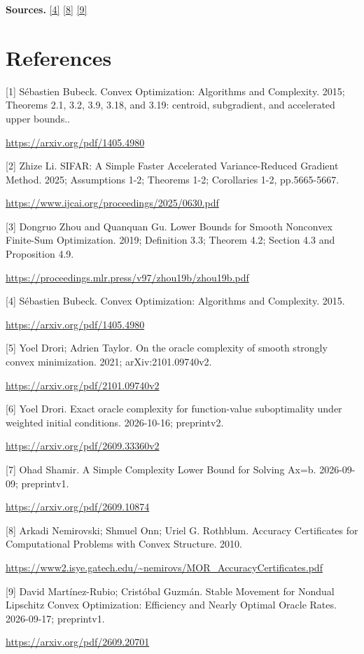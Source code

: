 \documentclass[10pt,a4paper]{article}
\begin{document}
\textbf{Sources.} \href{https://arxiv.org/pdf/1405.4980}{[4]} \href{https://www2.isye.gatech.edu/~nemirovs/MOR_AccuracyCertificates.pdf}{[8]} \href{https://arxiv.org/pdf/2609.20701}{[9]}

\section{References}
[1] Sébastien Bubeck. Convex Optimization: Algorithms and Complexity. 2015; Theorems 2.1, 3.2, 3.9, 3.18, and 3.19: centroid, subgradient, and accelerated upper bounds..

\url{https://arxiv.org/pdf/1405.4980}

[2] Zhize Li. SIFAR: A Simple Faster Accelerated Variance-Reduced Gradient Method. 2025; Assumptions 1-2; Theorems 1-2; Corollaries 1-2, pp.5665-5667.

\url{https://www.ijcai.org/proceedings/2025/0630.pdf}

[3] Dongruo Zhou and Quanquan Gu. Lower Bounds for Smooth Nonconvex Finite-Sum Optimization. 2019; Definition 3.3; Theorem 4.2; Section 4.3 and Proposition 4.9.

\url{https://proceedings.mlr.press/v97/zhou19b/zhou19b.pdf}

[4] Sébastien Bubeck. Convex Optimization: Algorithms and Complexity. 2015.

\url{https://arxiv.org/pdf/1405.4980}

[5] Yoel Drori; Adrien Taylor. On the oracle complexity of smooth strongly convex minimization. 2021; arXiv:2101.09740v2.

\url{https://arxiv.org/pdf/2101.09740v2}

[6] Yoel Drori. Exact oracle complexity for function-value suboptimality under weighted initial conditions. 2026-10-16; preprintv2.

\url{https://arxiv.org/pdf/2609.33360v2}

[7] Ohad Shamir. A Simple Complexity Lower Bound for Solving Ax=b. 2026-09-09; preprintv1.

\url{https://arxiv.org/pdf/2609.10874}

[8] Arkadi Nemirovski; Shmuel Onn; Uriel G. Rothblum. Accuracy Certificates for Computational Problems with Convex Structure. 2010.

\url{https://www2.isye.gatech.edu/~nemirovs/MOR_AccuracyCertificates.pdf}

[9] David Martínez-Rubio; Cristóbal Guzmán. Stable Movement for Nondual Lipschitz Convex Optimization: Efficiency and Nearly Optimal Oracle Rates. 2026-09-17; preprintv1.

\url{https://arxiv.org/pdf/2609.20701}
\end{document}
